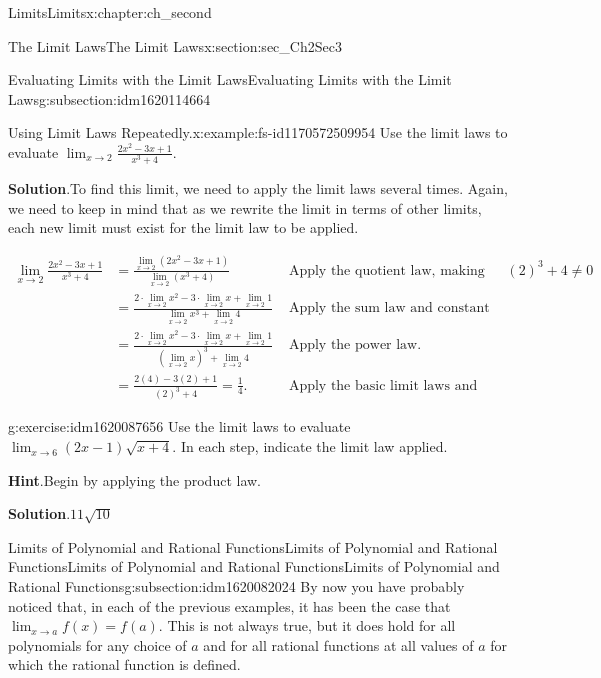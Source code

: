 \documentclass[oneside,10pt,]{book}
\newcommand{\blocktitlefont}{\relax}
\numberwithin{equation}{section}
\newcommand{\amp}{&}
\begin{document}
\begin{chapterptx}{Limits}{}{Limits}{}{}{x:chapter:ch_second}
\begin{sectionptx}{The Limit Laws}{}{The Limit Laws}{}{}{x:section:sec_Ch2Sec3}
\begin{subsectionptx}{Evaluating Limits with the Limit Laws}{}{Evaluating Limits with the Limit Laws}{}{}{g:subsection:idm1620114664}
\begin{example}{Using Limit Laws Repeatedly.}{x:example:fs-id1170572509954}
Use the limit laws to evaluate \(\lim_{x \to 2 }\frac{2x^2-3x+1}{x^3+4}.\)%
\par\smallskip%
\noindent\textbf{\blocktitlefont Solution}.\hypertarget{g:solution:idm1620085864}{}\quad{}To find this limit, we need to apply the limit laws several times. Again, we need to keep in mind that as we rewrite the limit in terms of other limits, each new limit must exist for the limit law to be applied.%
\par
%
\begin{align*}
\lim_{x \to 2 }\frac{2x^2-3x+1}{x^3+4}\amp=\frac{\lim_{x \to 2 }(2x^2-3x+1)}{\lim_{x \to 2 }(x^3+4)}\amp\text{ Apply the quotient law, making sure that. } (2)^3+4\neq 0\\
\amp=\frac{2\cdot \lim_{x \to 2 }x^2-3\cdot \lim_{x \to 2 }x+\lim_{x \to 2 }1}{\lim_{x \to 2 }x^3+\lim_{x \to 2 }4}\amp\text{ Apply the sum law and constant multiple law. }\\
\amp=\frac{2\cdot \lim_{x \to 2 }x^2-3\cdot \lim_{x \to 2 }x+\lim_{x \to 2 }1}{(\lim_{x \to 2 }x)^3+\lim_{x \to 2 }4}\amp\text{ Apply the power law. }\\
\amp=\frac{2(4)-3(2)+1}{(2)^3+4}=\frac{1}{4}.\amp\text{ Apply the basic limit laws and simplify. }
\end{align*}
%
\end{example}
\begin{inlineexercise}{}{g:exercise:idm1620087656}%
Use the limit laws to evaluate \(\lim_{x \to 6 }(2x-1)\sqrt{x+4}.\) In each step, indicate the limit law applied.%
\par\smallskip%
\noindent\textbf{\blocktitlefont Hint}.\hypertarget{g:hint:idm1620081640}{}\quad{}Begin by applying the product law.%
\par\smallskip%
\noindent\textbf{\blocktitlefont Solution}.\hypertarget{g:solution:idm1620082408}{}\quad{}\(11\sqrt{10}\)%
\end{inlineexercise}%
\end{subsectionptx}
%
%
\typeout{************************************************}
\typeout{************************************************}
%
\begin{subsectionptx}{Limits of Polynomial and Rational FunctionsLimits of Polynomial and Rational Functions}{}{Limits of Polynomial and Rational FunctionsLimits of Polynomial and Rational Functions}{}{}{g:subsection:idm1620082024}
By now you have probably noticed that, in each of the previous examples, it has been the case that \(\lim_{x \to a }f(x)=f(a).\) This is not always true, but it does hold for all polynomials for any choice of \(a\) and for all rational functions at all values of \(a\) for which the rational function is defined.%

\end{subsectionptx}
\end{sectionptx}
\end{chapterptx}
\end{document}

